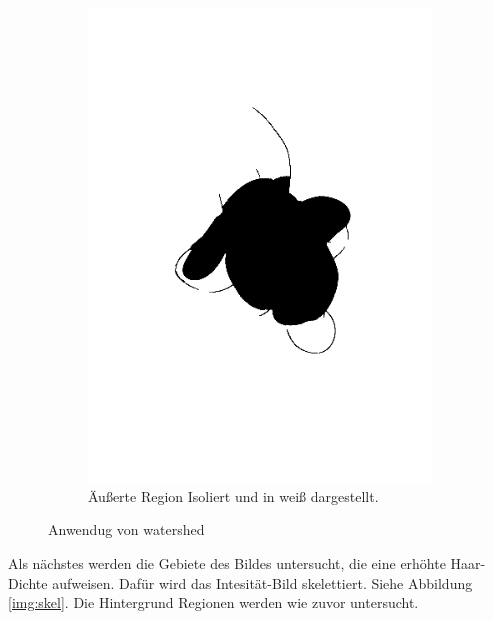 \documentclass[german,a4paper, 12pt]{scrartcl}
\begin{document}
\begin{figure}
\begin{subfigure}[b]{0.475\textwidth}
		\includegraphics[width=\textwidth]{fig64/08outer section.png}
		\caption[]{Äußerte Region Isoliert und in weiß dargestellt.}
		\label{img:outerSection}
	\end{subfigure}
	\caption[  ]
	{\small Anwendug von watershed} 
	\label{img:tstM}
\end{figure}

Als nächstes werden die Gebiete des Bildes untersucht, die eine erhöhte Haar-Dichte aufweisen.
Dafür wird das Intesität-Bild skelettiert. Siehe Abbildung \ref{img:skel}.
Die Hintergrund Regionen werden wie zuvor untersucht.
\end{document}
